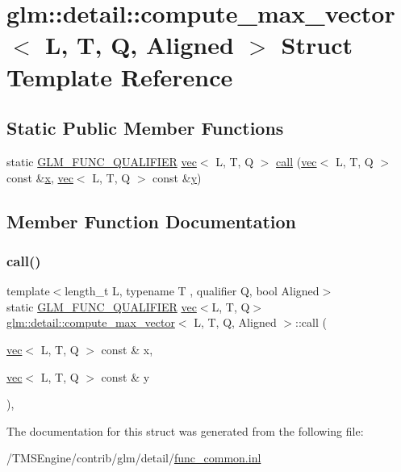 \hypertarget{structglm_1_1detail_1_1compute__max__vector}{}\section{glm\+:\+:detail\+:\+:compute\+\_\+max\+\_\+vector$<$ L, T, Q, Aligned $>$ Struct Template Reference}
\label{structglm_1_1detail_1_1compute__max__vector}
\subsection*{Static Public Member Functions}
\begin{DoxyCompactItemize}
\item 
static \hyperlink{setup_8hpp_a33fdea6f91c5f834105f7415e2a64407}{G\+L\+M\+\_\+\+F\+U\+N\+C\+\_\+\+Q\+U\+A\+L\+I\+F\+I\+ER} \hyperlink{structglm_1_1vec}{vec}$<$ L, T, Q $>$ \hyperlink{structglm_1_1detail_1_1compute__max__vector_a8eb01a7ef3c3e1898a1d2ddbb66168d9}{call} (\hyperlink{structglm_1_1vec}{vec}$<$ L, T, Q $>$ const \&\hyperlink{_s_d_l__opengl_8h_ad0e63d0edcdbd3d79554076bf309fd47}{x}, \hyperlink{structglm_1_1vec}{vec}$<$ L, T, Q $>$ const \&\hyperlink{_s_d_l__opengl_8h_a1675d9d7bb68e1657ff028643b4037e3}{y})
\end{DoxyCompactItemize}


\subsection{Member Function Documentation}
\mbox{\label{structglm_1_1detail_1_1compute__max__vector_a8eb01a7ef3c3e1898a1d2ddbb66168d9}} 
\subsubsection{\texorpdfstring{call()}{call()}}
{\footnotesize\ttfamily template$<$length\+\_\+t L, typename T , qualifier Q, bool Aligned$>$ \\
static \hyperlink{setup_8hpp_a33fdea6f91c5f834105f7415e2a64407}{G\+L\+M\+\_\+\+F\+U\+N\+C\+\_\+\+Q\+U\+A\+L\+I\+F\+I\+ER} \hyperlink{structglm_1_1vec}{vec}$<$L, T, Q$>$ \hyperlink{structglm_1_1detail_1_1compute__max__vector}{glm\+::detail\+::compute\+\_\+max\+\_\+vector}$<$ L, T, Q, Aligned $>$\+::call (\begin{DoxyParamCaption}\item[{\hyperlink{structglm_1_1vec}{vec}$<$ L, T, Q $>$ const \&}]{x,  }\item[{\hyperlink{structglm_1_1vec}{vec}$<$ L, T, Q $>$ const \&}]{y }\end{DoxyParamCaption})\hspace{0.3cm}{\ttfamily [inline]}, {\ttfamily [static]}}



The documentation for this struct was generated from the following file\+:\begin{DoxyCompactItemize}
\item 
/\+T\+M\+S\+Engine/contrib/glm/detail/\hyperlink{func__common_8inl}{func\+\_\+common.\+inl}\end{DoxyCompactItemize}
